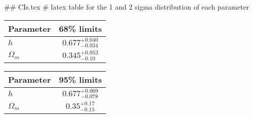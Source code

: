 ## CIs.tex
# latex table for the 1 and 2 sigma distribution of each parameter

\begin{tabular} { l  c}
 Parameter &  68\% limits\\
\hline
{\boldmath$h              $} & $0.677^{+0.040}_{-0.034}   $\\
{\boldmath$\Omega_m       $} & $0.345^{+0.053}_{-0.10}    $\\
\hline
\end{tabular}

\begin{tabular} { l  c}
 Parameter &  95\% limits\\
\hline
{\boldmath$h              $} & $0.677^{+0.069}_{-0.078}   $\\
{\boldmath$\Omega_m       $} & $0.35^{+0.17}_{-0.15}      $\\
\hline
\end{tabular}
